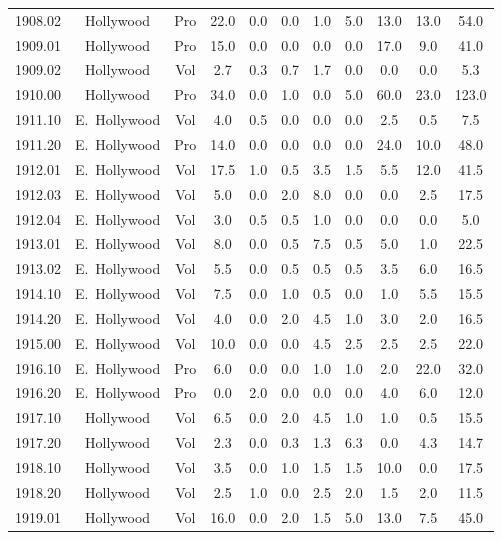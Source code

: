 \documentclass[11pt,twocolumn]{article}
\begin{document}
\begin{table}[t]
\begin{tabular}{ccccccccccc}
1908.02 & Hollywood & Pro & 22.0 &  0.0 &  0.0 &  1.0 &  5.0 & 13.0 & 13.0 &  54.0 \\
1909.01 & Hollywood & Pro & 15.0 &  0.0 &  0.0 &  0.0 &  0.0 & 17.0 &  9.0 &  41.0 \\
1909.02 & Hollywood & Vol &  2.7 &  0.3 &  0.7 &  1.7 &  0.0 &  0.0 &  0.0 &   5.3 \\
1910.00 & Hollywood & Pro & 34.0 &  0.0 &  1.0 &  0.0 &  5.0 & 60.0 & 23.0 & 123.0 \\
1911.10 & E.~Hollywood & Vol &  4.0 &  0.5 &  0.0 &  0.0 &  0.0 &  2.5 &  0.5 &   7.5 \\
1911.20 & E.~Hollywood & Pro & 14.0 &  0.0 &  0.0 &  0.0 &  0.0 & 24.0 & 10.0 &  48.0 \\
1912.01 & E.~Hollywood & Vol & 17.5 &  1.0 &  0.5 &  3.5 &  1.5 &  5.5 & 12.0 &  41.5 \\
1912.03 & E.~Hollywood & Vol &  5.0 &  0.0 &  2.0 &  8.0 &  0.0 &  0.0 &  2.5 &  17.5 \\
1912.04 & E.~Hollywood & Vol &  3.0 &  0.5 &  0.5 &  1.0 &  0.0 &  0.0 &  0.0 &   5.0 \\
1913.01 & E.~Hollywood & Vol &  8.0 &  0.0 &  0.5 &  7.5 &  0.5 &  5.0 &  1.0 &  22.5 \\
1913.02 & E.~Hollywood & Vol &  5.5 &  0.0 &  0.5 &  0.5 &  0.5 &  3.5 &  6.0 &  16.5 \\
1914.10 & E.~Hollywood & Vol &  7.5 &  0.0 &  1.0 &  0.5 &  0.0 &  1.0 &  5.5 &  15.5 \\
1914.20 & E.~Hollywood & Vol &  4.0 &  0.0 &  2.0 &  4.5 &  1.0 &  3.0 &  2.0 &  16.5 \\
1915.00 & E.~Hollywood & Vol & 10.0 &  0.0 &  0.0 &  4.5 &  2.5 &  2.5 &  2.5 &  22.0 \\
1916.10 & E.~Hollywood & Pro &  6.0 &  0.0 &  0.0 &  1.0 &  1.0 &  2.0 & 22.0 &  32.0 \\
1916.20 & E.~Hollywood & Pro &  0.0 &  2.0 &  0.0 &  0.0 &  0.0 &  4.0 &  6.0 &  12.0 \\
1917.10 & Hollywood & Vol &  6.5 &  0.0 &  2.0 &  4.5 &  1.0 &  1.0 &  0.5 &  15.5 \\
1917.20 & Hollywood & Vol &  2.3 &  0.0 &  0.3 &  1.3 &  6.3 &  0.0 &  4.3 &  14.7 \\
1918.10 & Hollywood & Vol &  3.5 &  0.0 &  1.0 &  1.5 &  1.5 & 10.0 &  0.0 &  17.5 \\
1918.20 & Hollywood & Vol &  2.5 &  1.0 &  0.0 &  2.5 &  2.0 &  1.5 &  2.0 &  11.5 \\
1919.01 & Hollywood & Vol & 16.0 &  0.0 &  2.0 &  1.5 &  5.0 & 13.0 &  7.5 &  45.0 \\

\end{tabular}
\end{table}
\end{document}
